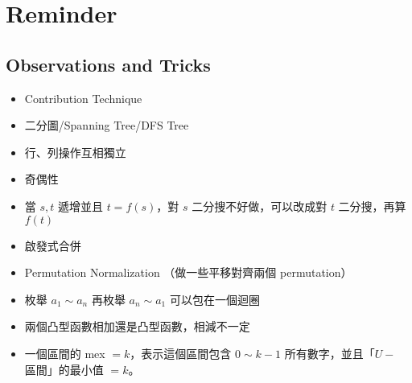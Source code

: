 \documentclass[a4paper,10pt,twocolumn,oneside]{article}
\begin{document}
\renewcommand{\headrulewidth}{0.4pt}
\makeatletter
\renewcommand{\tableofcontents}{%
  \@starttoc{toc}%
}
\makeatother

\pagestyle{fancy}
\fancyfoot{}
\fancyhead[R]{\thepage}


{\scriptsize \tableofcontents}



\section{Reminder}

\subsection{Observations and Tricks}
\begin{itemize}[nolistsep]
    \item Contribution Technique
    \item 二分圖/Spanning Tree/DFS Tree
    \item 行、列操作互相獨立
    \item 奇偶性
    \item 當 $s, t$ 遞增並且 $t = f(s)$，對 $s$ 二分搜不好做，可以改成對 $t$ 二分搜，再算 $f(t)$
    \item 啟發式合併
    \item Permutation Normalization （做一些平移對齊兩個 permutation）
    \item 枚舉 $a_1 \sim a_n$ 再枚舉 $a_n \sim a_1$ 可以包在一個迴圈
    \item 兩個凸型函數相加還是凸型函數，相減不一定
    \item 一個區間的 mex $= k$，表示這個區間包含 $0 \sim k - 1$ 所有數字，並且「$U -$ 區間」的最小值 $= k$。
\end{itemize}
\end{document}
